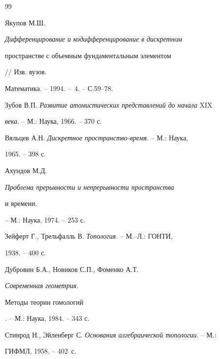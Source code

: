 \begin{thebibliography}{99} 


 




Якупов М.Ш. {\em Дифференцирование и кодифференцирование в дискретном 


пространстве с объемным фундаментальным элементом} // Изв. вузов. 


Математика. -- 1994. -- \No\,4. -- С.59--78. 


 




Зубов В.П. {\em Развитие атомистических представлений до начала} XIX 


{\em века}. -- М.: Наука, 1966. -- 370 с. 


 




Вяльцев А.Н. {\em Дискретное пространство-время.} -- М.: Наука, 


1965. -- 398 с. 


 




Ахундов М.Д. {\em Проблема прерывности и непрерывности пространства 


и времени.} -- М.: Наука, 1974. -- 253 с. 


 




Зейферт Г., Трельфалль В. {\em Топология.} -- М.--Л.: ГОНТИ, 


1938. -- 400 с. 


 




Дубровин Б.А., Новиков С.П., Фоменко А.Т. {\em Современная геометрия. 


Методы теории гомологий}. -- М.: Наука, 1984. -- 343 с. 


 




Стинрод Н., Эйленберг С. {\em Основания алгебраической топологии}. -- М.: 


ГИФМЛ, 1958. -- 402~с. 


 



\end{thebibliography}
